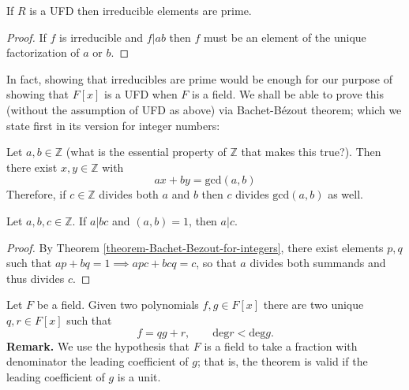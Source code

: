 \begin{lemma}
\label{lemma-irreducible-is-prime}
If $R$ is a UFD then irreducible elements are prime.
\end{lemma}

\begin{proof}
If $f$ is irreducible and $f|ab$ then $f$ must be an element of the unique
factorization of $a$ or $b$.
\end{proof}

In fact, showing that irreducibles are prime would be enough for our purpose of
showing that $F[x]$ is a UFD when $F$ is a field. We shall be able to prove this
(without the assumption of UFD as above) via Bachet-Bézout theorem; which we
state first in its version for integer numbers:

\begin{theorem}
\label{theorem-Bachet-Bezout-for-integers}
\begin{reference}
\cite[Theorem 1.7]{MMST}
\end{reference}
Let $a,b \in \mathbb{Z}$ (what is the essential property of $\mathbb{Z}$ that
makes this true?). Then
there exist $x,y \in \mathbb{Z}$ with
 $$
ax+by=\text{gcd}(a,b)
$$
Therefore, if $c \in \mathbb{Z}$ divides both $a$ and $b$ then $c$ divides
$\text{gcd}(a,b)$ as well.
\end{theorem}

\begin{lemma}
\label{lemma-relatively-prime-and-divides-implies-divides}
Let $a,b,c \in \mathbb{Z}$. If $a|bc$ and $(a,b)=1$, then $a|c$.
\end{lemma}

\begin{proof}
By Theorem \ref{theorem-Bachet-Bezout-for-integers}, 
there exist elements $p,q$ such
that $ap+bq=1\implies apc+bcq=c$, so that $a$ divides both summands and thus
divides $c$.
\end{proof}

\begin{theorem}
\label{theorem-division-algoritm-for-polynomials}
\begin{reference}
\cite[Theorem 1.48]{MMST}
\end{reference}
Let $F$ be a field. Given two polynomials $f,g \in F[x]$ there are two unique
$q,r \in F[x]$ such that
$$
f=qg+r,\qquad \text{deg}r<\text{deg}g.
$$
{\bf Remark.} We use the hypothesis that $F$ is a field to take a fraction with
denominator the leading coefficient of $g$; that is, the theorem is valid if the
leading coefficient of $g$ is a unit.
\end{theorem}

